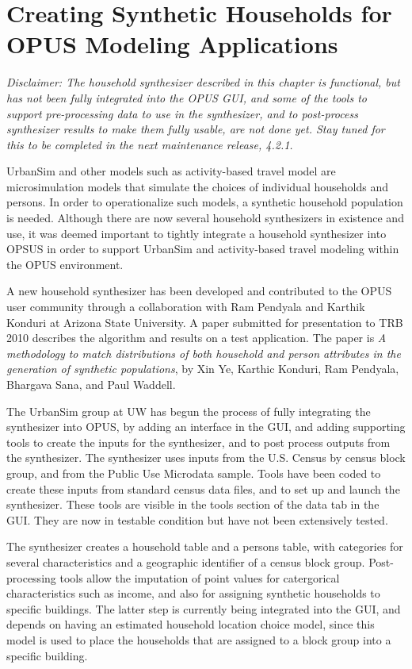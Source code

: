 \chapter{Creating Synthetic Households for OPUS Modeling Applications}

\emph{Disclaimer: The household synthesizer described in this chapter is functional, but has not been fully integrated into the OPUS GUI, and some of the tools to support pre-processing data to use in the synthesizer, and to post-process synthesizer results to make them fully usable, are not done yet.  Stay tuned for this to be completed in the next maintenance release, 4.2.1.}

UrbanSim and other models such as activity-based travel model are microsimulation models that simulate the choices of individual households and persons.  In order to operationalize such models, a synthetic household population is needed.  Although there are now several household synthesizers in existence and use, it was deemed important to tightly integrate a household synthesizer into OPSUS in order to support UrbanSim and activity-based travel modeling within the OPUS environment.

A new household synthesizer has been developed and contributed to the OPUS user community through a collaboration with Ram Pendyala and Karthik Konduri at Arizona State University.  A paper submitted for presentation to TRB 2010 describes the algorithm and results on a test application. The paper is \emph{A methodology to match distributions of both household and person attributes in the generation of synthetic populations}, by Xin Ye, Karthic Konduri, Ram Pendyala, Bhargava Sana, and Paul Waddell. 

The UrbanSim group at UW has begun the process of fully integrating the synthesizer into OPUS, by adding an interface in the GUI, and adding supporting tools to create the inputs for the synthesizer, and to post process outputs from the synthesizer.  The synthesizer uses inputs from the U.S. Census by census block group, and from the Public Use Microdata sample.  Tools have been coded to create these inputs from standard census data files, and to set up and launch the synthesizer.  These tools are visible in the tools section of the data tab in the GUI.  They are now in testable condition but have not been extensively tested.

The synthesizer creates a household table and a persons table, with categories for several characteristics and a geographic identifier of a census block group.  Post-processing tools allow the imputation of point values for catergorical characteristics such as income, and also for assigning synthetic households to specific buildings.  The latter step is currently being integrated into the GUI, and depends on having an estimated household location choice model, since this model is used to place the households that are assigned to a block group into a specific building.

